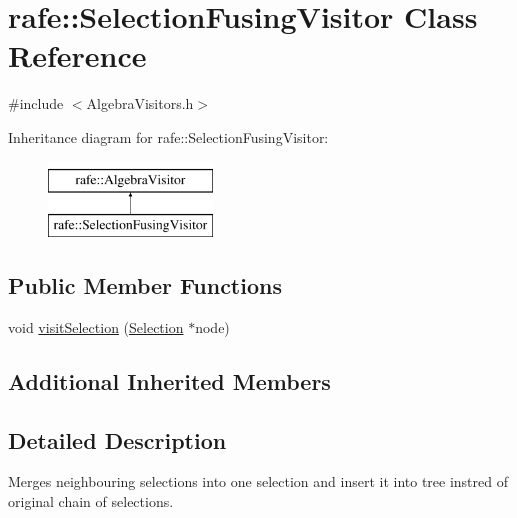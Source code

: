 \hypertarget{classrafe_1_1_selection_fusing_visitor}{\section{rafe\+:\+:Selection\+Fusing\+Visitor Class Reference}
\label{classrafe_1_1_selection_fusing_visitor}
}


{\ttfamily \#include $<$Algebra\+Visitors.\+h$>$}

Inheritance diagram for rafe\+:\+:Selection\+Fusing\+Visitor\+:\begin{figure}[H]
\begin{center}
\leavevmode
\includegraphics[height=2.000000cm]{classrafe_1_1_selection_fusing_visitor}
\end{center}
\end{figure}
\subsection*{Public Member Functions}
\begin{DoxyCompactItemize}
\item 
void \hyperlink{classrafe_1_1_selection_fusing_visitor_a4f728e97bda224020772f6a7c7cbb775}{visit\+Selection} (\hyperlink{classrafe_1_1_selection}{Selection} $\ast$node)
\end{DoxyCompactItemize}
\subsection*{Additional Inherited Members}


\subsection{Detailed Description}
Merges neighbouring selections into one selection and insert it into tree instred of original chain of selections. 

